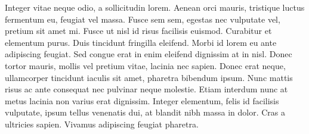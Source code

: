 Integer vitae neque odio, a sollicitudin lorem. Aenean orci mauris, tristique luctus fermentum eu, feugiat vel massa. Fusce sem sem, egestas nec vulputate vel, pretium sit amet mi. Fusce ut nisl id risus facilisis euismod. Curabitur et elementum purus. Duis tincidunt fringilla eleifend. Morbi id lorem eu ante adipiscing feugiat. Sed congue erat in enim eleifend dignissim at in nisl. Donec tortor mauris, mollis vel pretium vitae, lacinia nec sapien. Donec erat neque, ullamcorper tincidunt iaculis sit amet, pharetra bibendum ipsum. Nunc mattis risus ac ante consequat nec pulvinar neque molestie. Etiam interdum nunc at metus lacinia non varius erat dignissim. Integer elementum, felis id facilisis vulputate, ipsum tellus venenatis dui, at blandit nibh massa in dolor. Cras a ultricies sapien. Vivamus adipiscing feugiat pharetra.	
	\clearpage